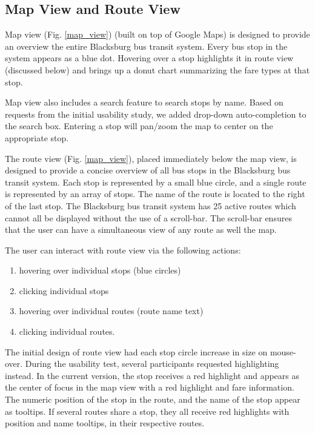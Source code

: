 \documentclass[journal]{vgtc}                %
\begin{document}
\subsection{Map View and Route View}

Map view (Fig. \ref{map_view}) (built on top of Google Maps) is designed to provide an overview the entire Blacksburg bus transit system. Every bus stop in the system appears as a blue dot. Hovering over a stop highlights it in route view (discussed below) and brings up a donut chart summarizing the fare types at that stop.

Map view also includes a search feature to search stops by name. Based on requests from the initial usability study, we added drop-down auto-completion to the search box. Entering a stop will pan/zoom the map to center on the appropriate stop.

The route view (Fig. \ref{map_view}), placed immediately below the map view, is designed to provide a concise overview of all bus stops in the Blacksburg bus transit system. Each stop is represented by a small blue circle, and a single route is represented by an array of stops. The name of the route is located to the right of the last stop. The Blacksburg bus transit system has 25 active routes which cannot all be displayed without the use of a scroll-bar. The scroll-bar ensures that the user can have a simultaneous view of any route as well the map. 

The user can interact with route view via the following actions:
\begin{enumerate}
  \item hovering over individual stops (blue circles)
  \item clicking individual stops 
  \item hovering over individual routes (route name text)
  \item clicking individual routes.
\end{enumerate}

The initial design of route view had each stop circle increase in size on mouse-over. During the usability test, several participants requested highlighting instead. In the current version, the stop receives a red highlight and appears as the center of focus in the map view with a red highlight and fare information. The numeric position of the stop in the route, and the name of the stop appear as tooltips. If several routes share a stop, they all receive red highlights with position and name tooltips, in their respective routes. 
\end{document}
